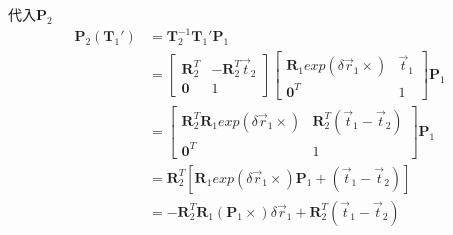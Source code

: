 \documentclass{article}
\begin{document}
代入$\boldsymbol{P}_2$
\begin{equation}
	\begin{aligned}
		\boldsymbol{P}_2(\boldsymbol{T}_1')                              & =\boldsymbol{T}_2^{-1}\boldsymbol{T}_1'\boldsymbol{P}_1 \\&=
		\left[ 
		\begin{matrix} 
		\boldsymbol{R}_2^{T}                                             & -\boldsymbol{R}_2^{T}\vec{t}_2                          \\
		\boldsymbol{0}                                                   & 1                                                       
		\end{matrix}
		\right]
		\left[ 
		\begin{matrix}  
		\boldsymbol{R}_1exp(\delta \vec{r}_1\times)                      & \vec{t}_1                                               \\ 
		\boldsymbol{0}^T                                                 & 1                                                       
		\end{matrix}
		\right]   \boldsymbol{P}_1\\&=
		\left[ 
		\begin{matrix} 
		\boldsymbol{R}_2^{T} \boldsymbol{R}_1exp(\delta \vec{r}_1\times) & \boldsymbol{R}_2^{T}(\vec{t}_1-\vec{t}_2)               \\ 
		\boldsymbol{0}^T                                                 & 1                                                       
		\end{matrix}
		\right]  \boldsymbol{P}_1 \\&= 
		\boldsymbol{R}_2^{T}[ \boldsymbol{R}_1exp(\delta \vec{r}_1\times)\boldsymbol{P}_1 +(\vec{t}_1-\vec{t}_2)]\\&=
		-\boldsymbol{R}_2^{T} \boldsymbol{R}_1(\boldsymbol{P}_1\times)\delta \vec{r}_1+\boldsymbol{R}_2^{T}(\vec{t}_1-\vec{t}_2)
	\end{aligned}
\end{equation}
\end{document}
